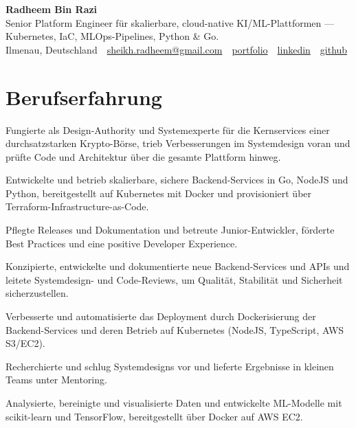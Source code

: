 \documentclass[11pt,a4paper]{resume}
\makeatletter
\newcommand{\Portfolio}{https://radheem.github.io/my-cv}
\newcommand{\PortfolioText}{portfolio}
\newcommand{\GitHub}{https://github.com/radheem}
\newcommand{\LinkedIn}{https://www.linkedin.com/in/radheem-razi}
\newcommand{\Email}{sheikh.radheem@gmail.com}
\makeatother
\begin{document}
\clearpage
{}

\begin{center}
  {\huge\bfseries Radheem Bin Razi}\\[3pt]
  {\large Senior Platform Engineer für skalierbare, cloud-native KI/ML-Plattformen — Kubernetes, IaC, MLOps-Pipelines, Python \& Go.}\\[6pt]
  \small
  Ilmenau, Deutschland \,\textbar\,
  \href{mailto:\Email}{\Email} \,\textbar\,
  \href{\Portfolio}{\PortfolioText} \,\textbar\,
  \href{\LinkedIn}{linkedin} \,\textbar\,
  \href{\GitHub}{github}
\end{center}
\vspace{2pt}

\section{Berufserfahrung}

\bullets
  \item Fungierte als Design-Authority und Systemexperte für die Kernservices einer durchsatzstarken Krypto-Börse, trieb Verbesserungen im Systemdesign voran und prüfte Code und Architektur über die gesamte Plattform hinweg.
  \item Entwickelte und betrieb skalierbare, sichere Backend-Services in Go, NodeJS und Python, bereitgestellt auf Kubernetes mit Docker und provisioniert über Terraform-Infrastructure-as-Code.
  \item Pflegte Releases und Dokumentation und betreute Junior-Entwickler, förderte Best Practices und eine positive Developer Experience.
\bulletsend
\vspace{3pt}
\bullets
  \item Konzipierte, entwickelte und dokumentierte neue Backend-Services und APIs und leitete Systemdesign- und Code-Reviews, um Qualität, Stabilität und Sicherheit sicherzustellen.
  \item Verbesserte und automatisierte das Deployment durch Dockerisierung der Backend-Services und deren Betrieb auf Kubernetes (NodeJS, TypeScript, AWS S3/EC2).
\bulletsend
\vspace{3pt}
\bullets
  \item Recherchierte und schlug Systemdesigns vor und lieferte Ergebnisse in kleinen Teams unter Mentoring.
  \item Analysierte, bereinigte und visualisierte Daten und entwickelte ML-Modelle mit scikit-learn und TensorFlow, bereitgestellt über Docker auf AWS EC2.
\bulletsend
\vspace{3pt}
\end{document}
